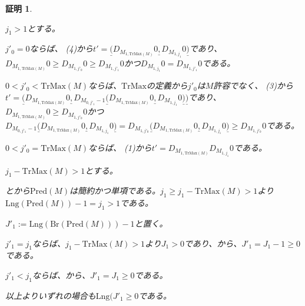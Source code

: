 \documentclass[dvipdfmx,uplatex]{jsarticle}
\theoremstyle{customnonumberbreakfortheorem}
\theoremstyle{customnonumberbreakforproof}
\newtheorem{hideableproof}{証明}
\begin{document}
\begin{hideableproof}
\begin{indented}
\begin{indented}
\begin{indented}
			\end{indented}
			\item \(j_1 > 1\)とする。
			\begin{indented}
				\item \(j'_0 = 0\)ならば、 (4)から\(t' = \underline{(} D_{M_{1,\textrm{TrMax}(M)}} 0 \underline{,} D_{M_{1,j_1}} 0 \underline{)}\)であり、\(D_{M_{1,\textrm{TrMax}(M)}} 0 \geq D_{M_{1,j'_0}} 0 \geq D_{M_{1,j'_1}} 0\)かつ\(D_{M_{1,j_1}} 0 = D_{M_{1,j'_1}} 0\)である。
				\item \(0 < j'_0 < \textrm{TrMax}(M)\)ならば、\(\textrm{TrMax}\)の定義から\(j'_0\)は\(M\)許容でなく、 (3)から\(t' = \underline{(} D_{M_{1,\textrm{TrMax}(M)}} 0 \underline{,} D_{M_{0,j'_1}-1} \underline{(} D_{M_{1,\textrm{TrMax}(M)}} 0 \underline{,} D_{M_{1,j_1}} 0 \underline{)} \underline{)}\)であり、\(D_{M_{1,\textrm{TrMax}(M)}} 0 \geq D_{M_{1,j'_0}} 0\)かつ\(D_{M_{0,j'_1}-1} \underline{(} D_{M_{1,\textrm{TrMax}(M)}} 0 \underline{,} D_{M_{1,j_1}} 0 \underline{)} = D_{M_{1,j'_0}} \underline{(} D_{M_{1,\textrm{TrMax}(M)}} 0 \underline{,} D_{M_{1,j_1}} 0 \underline{)} \geq D_{M_{1,j'_0}} 0\)である。
				\item \(0 < j'_0 = \textrm{TrMax}(M)\)ならば、 (1)から\(t' = D_{M_{1,\textrm{TrMax}(M)}} D_{M_{1,j_1}} 0\)である。
			\end{indented}
		\end{indented}
		\item \(j_1 - \textrm{TrMax}(M) > 1\)とする。
		\begin{indented}
			\item {}とから\(\textrm{Pred}(M)\)は簡約かつ単項である。\(j_1 \geq j_1 - \textrm{TrMax}(M) > 1\)より\(\textrm{Lng}(\textrm{Pred}(M))-1 = j_1 > 1\)である。
			\item \(J'_1 := \textrm{Lng}(\textrm{Br}(\textrm{Pred}(M)))-1\)と置く。
			\item \(j'_1 = j_1\)ならば、\(j_1 - \textrm{TrMax}(M) > 1\)より\(J_1 > 0\)であり、から、\(J'_1 = J_1-1 \geq 0\)である。
			\item \(j'_1 < j_1\)ならば、から、\(J'_1 = J_1 \geq 0\)である。
			\item 以上よりいずれの場合も\(\textrm{Lng}(J'_1 \geq 0\)である。

\end{indented}
\end{indented}
\end{hideableproof}
\end{document}
